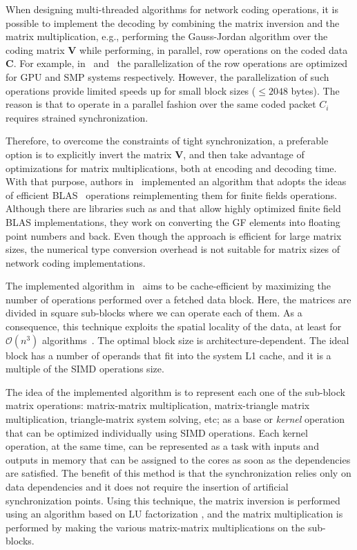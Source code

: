 When designing multi-threaded algorithms for network coding
operations, it is possible to implement the decoding by combining the
matrix inversion and the matrix multiplication, e.g., performing the
Gauss-Jordan algorithm over the coding matrix $\textbf{V}$ while
performing, in parallel, row operations on the coded data
$\textbf{C}$. For example, in~\cite{5061951} and~\cite{4262451} the
parallelization of the row operations are optimized for \ac{GPU} and
\ac{SMP} systems respectively. However, the parallelization of such
operations provide limited speeds up for small block sizes
($\leq 2048$ bytes). The reason is that to operate in a parallel
fashion over the same coded packet $C_i$ requires strained
synchronization.

Therefore, to overcome the constraints of tight synchronization, a
preferable option is to explicitly invert the matrix $\textbf{V}$, and then
take advantage of optimizations for matrix multiplications, both at
encoding and decoding time. With that purpose, authors
in~\cite{wunderlich2015network} implemented an algorithm that adopts
the ideas of efficient \ac{BLAS}~\cite{lawson1979basic} operations
reimplementing them for finite fields operations. Although there are
libraries such as \cite{dumas2008dense} and \cite{dumas2002linbox} that allow
highly optimized finite field \ac{BLAS} implementations, they work on
converting the \ac{GF} elements into floating point numbers and back.
Even though the approach is efficient for large matrix sizes, the
numerical type conversion overhead is not suitable for matrix sizes of
network coding implementations.

The implemented algorithm in~\cite{wunderlich2015network} aims to be
cache-efficient by maximizing the number of operations performed over a
fetched data block. Here, the matrices are divided in square sub-blocks
where we can operate each of them. As a consequence, this technique
exploits the spatial locality of the data, at least for
$\mathcal{O}(n^3)$ algorithms~\cite{golub2012matrix}. The optimal block
size is architecture-dependent. The ideal block has a number of operands
that fit into the system L1 cache, and it is a multiple of the \ac{SIMD}
operations size.

The idea of the implemented algorithm is to represent each one of the sub-block
matrix operations: matrix-matrix multiplication, matrix-triangle matrix
multiplication, triangle-matrix system solving, etc; as a base or
\textit{kernel} operation that can be optimized individually using \ac{SIMD}
operations. Each kernel operation, at the same time, can be represented as a
task with inputs and outputs in memory that can be assigned to the cores as soon
as the dependencies are satisfied. The benefit of this method is that the
synchronization relies only on data dependencies and it does not require the
insertion of artificial synchronization points. Using this technique, the matrix
inversion is performed using an algorithm based on LU factorization
\cite{Dongarra:2011:HPM:2132876.2132885}, and the matrix multiplication is
performed by making the various matrix-matrix multiplications on the sub-blocks.
